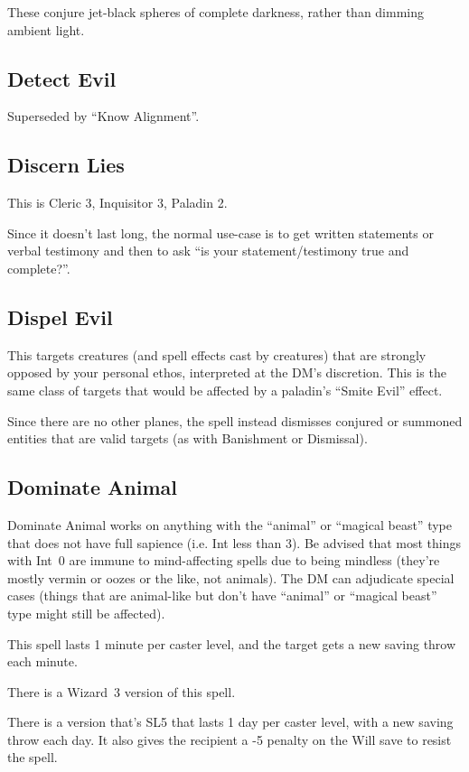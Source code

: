 These conjure jet-black spheres of complete darkness, rather than dimming
ambient light.
%

%
\subsection{Detect Evil}

Superseded by ``Know Alignment''.
%

%
\subsection{Discern Lies}

This is Cleric 3, Inquisitor 3, Paladin 2.

Since it doesn't last long, the normal use-case is to get written
statements or verbal testimony and then to ask ``is your
statement/testimony true and complete?''.
%

%
\subsection{Dispel Evil}

This targets creatures (and spell effects cast by creatures) that are
strongly opposed by your personal ethos, interpreted at the DM's discretion.
This is the same class of targets that would be affected by a paladin's
``Smite Evil'' effect.

Since there are no other planes, the spell instead dismisses conjured or
summoned entities that are valid targets (as with Banishment or Dismissal).
%

%
\subsection{Dominate Animal}

Dominate Animal works on anything with the ``animal'' or ``magical beast''
type that does not have full sapience (i.e. Int less than 3). Be advised
that most things with Int~0 are immune to mind-affecting spells due to
being mindless (they're mostly vermin or oozes or the like, not animals).
The DM can adjudicate special cases (things that are animal-like but don't
have ``animal'' or ``magical beast'' type might still be affected).

This spell lasts 1 minute per caster level, and the target gets a new
saving throw each minute.

There is a Wizard~3 version of this spell.

There is a version that's SL5 that lasts 1 day per caster level, with a new
saving throw each day. It also gives the recipient a -5 penalty on the Will
save to resist the spell.
%

